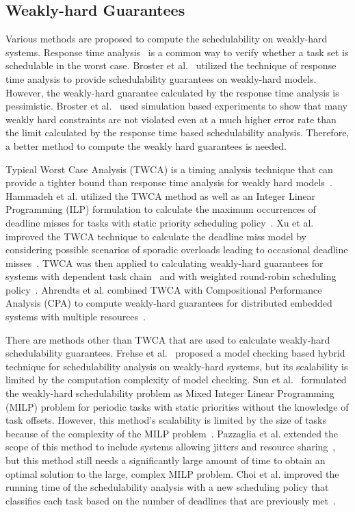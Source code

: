 \subsection{Weakly-hard Guarantees}
Various methods are proposed to compute the schedulability on weakly-hard systems. Response time analysis~\cite{joseph1986finding} is a common way to verify whether a task set is schedulable in the worst case. Broster et al.~\cite{broster2002weakly} utilized the technique of response time analysis to provide schedulability guarantees on weakly-hard models. However, the weakly-hard guarantee calculated by the response time analysis is pessimistic. Broster et al.~\cite{broster2002weakly} used simulation based experiments to show that many weakly hard constraints are not violated even at a much higher error rate than the limit calculated by the response time based schedulability analysis. Therefore, a better method to compute the weakly hard guarantees is needed. 

Typical Worst Case Analysis (TWCA) is a timing analysis technique that can provide a tighter bound than response time analysis for weakly hard models~\cite{quinton2012twca}. Hammadeh et al. utilized the TWCA method as well as an Integer Linear Programming (ILP) formulation to calculate the maximum occurrences of deadline misses for tasks with static priority scheduling policy~\cite{hammadeh2014extending}. Xu et al. improved the TWCA technique to calculate the deadline miss model by considering possible scenarios of sporadic overloads leading to occasional deadline misses~\cite{xu2015improve}. TWCA was then applied to calculating weakly-hard guarantees for systems with dependent task chain~\cite{hammadeh2017bound} and with weighted round-robin scheduling policy~\cite{hammadeh2018weakly}. Ahrendts et al. combined TWCA with Compositional Performance Analysis (CPA) to compute weakly-hard guarantees for distributed embedded systems with multiple resources~\cite{ahrendts2018verifying}.

There are methods other than TWCA that are used to calculate weakly-hard schedulability guarantees. Frehse et al.~\cite{frehse2014formal} proposed a model checking based hybrid technique for schedulability analysis on weakly-hard systems, but its scalability is limited by the computation complexity of model checking. Sun et al.~\cite{sun2017weakly} formulated the weakly-hard schedulability problem as Mixed Integer Linear Programming (MILP) problem for periodic tasks with static priorities without the knowledge of task offsets. However, this method's scalability is limited by the size of tasks because of the complexity of the MILP problem~\cite{sun2017weakly}. Pazzaglia et al. extended the scope of this method to include systems allowing jitters and resource sharing~\cite{pazzagliageneralized}, but this method still needs a significantly large amount of time to obtain an optimal solution to the large, complex MILP problem. Choi et al. improved the running time of the schedulability analysis with a new scheduling policy that classifies each task based on the number of deadlines that are previously met~\cite{choi2019job}. 


